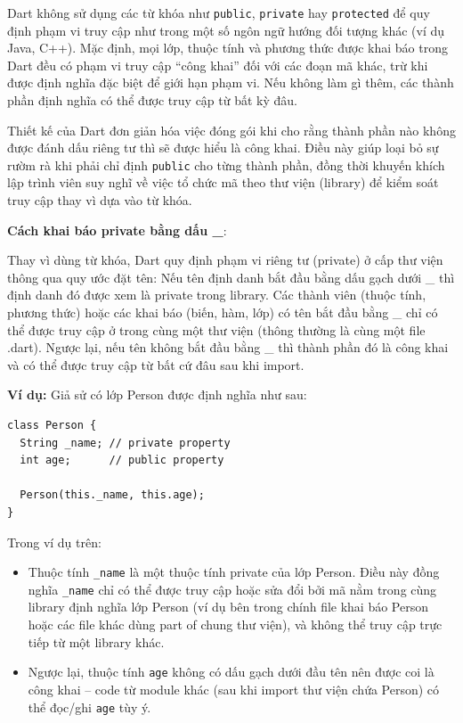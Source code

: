 \documentclass[../DoAn.tex]{subfiles}
\numberwithin{figure}{chapter}
\begin{document}
Dart không sử dụng các từ khóa như \texttt{public}, \texttt{private} hay \texttt{protected} để quy định phạm vi truy cập như trong một số ngôn ngữ hướng đối tượng khác (ví dụ Java, C++). Mặc định, mọi lớp, thuộc tính và phương thức được khai báo trong Dart đều có phạm vi truy cập “công khai” đối với các đoạn mã khác, trừ khi được định nghĩa đặc biệt để giới hạn phạm vi. Nếu không làm gì thêm, các thành phần định nghĩa có thể được truy cập từ bất kỳ đâu. 

Thiết kế của Dart đơn giản hóa việc đóng gói khi cho rằng thành phần nào không được đánh dấu riêng tư thì sẽ được hiểu là công khai. Điều này giúp loại bỏ sự rườm rà khi phải chỉ định \texttt{public} cho từng thành phần, đồng thời khuyến khích lập trình viên suy nghĩ về việc tổ chức mã theo thư viện (library) để kiểm soát truy cập thay vì dựa vào từ khóa.

\textbf{Cách khai báo private bằng dấu {\textbf{\_}}}: 

Thay vì dùng từ khóa, Dart quy định phạm vi riêng tư (private) ở cấp thư viện thông qua quy ước đặt tên: Nếu tên định danh bắt đầu bằng dấu gạch dưới \_ thì định danh đó được xem là private trong library. Các thành viên (thuộc tính, phương thức) hoặc các khai báo (biến, hàm, lớp) có tên bắt đầu bằng \_ chỉ có thể được truy cập ở trong cùng một thư viện (thông thường là cùng một file .dart). Ngược lại, nếu tên không bắt đầu bằng \_ thì thành phần đó là công khai và có thể được truy cập từ bất cứ đâu sau khi import. 

\textbf{Ví dụ:} Giả sử có lớp Person được định nghĩa như sau: 
\begin{lstlisting}
class Person {
  String _name; // private property
  int age;      // public property

  Person(this._name, this.age);
}
\end{lstlisting}

Trong ví dụ trên: 
\begin{itemize}
    \item Thuộc tính {\texttt{\_name}} là một thuộc tính private của lớp Person. Điều này đồng nghĩa {\texttt{\_name}} chỉ có thể được truy cập hoặc sửa đổi bởi mã nằm trong cùng library định nghĩa lớp Person (ví dụ bên trong chính file khai báo Person hoặc các file khác dùng part of chung thư viện), và không thể truy cập trực tiếp từ một library khác. 
    \item Ngược lại, thuộc tính \texttt{age} không có dấu gạch dưới đầu tên nên được coi là công khai – code từ module khác (sau khi import thư viện chứa Person) có thể đọc/ghi \texttt{age} tùy ý.
\end{itemize}
\end{document}
